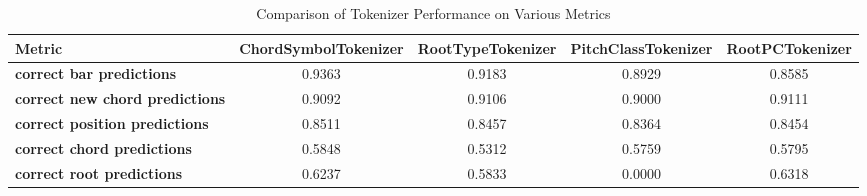 
\begin{table}[h]
    \centering
    \renewcommand{\arraystretch}{1.2}
    \begin{tabular}{lcccc}
        \hline
        \textbf{Metric} & \textbf{ChordSymbolTokenizer} & \textbf{RootTypeTokenizer} & \textbf{PitchClassTokenizer} & \textbf{RootPCTokenizer} \\
        \hline
        \textbf{correct bar predictions} & 0.9363 & 0.9183 & 0.8929 & 0.8585 \\
    \textbf{correct new chord predictions} & 0.9092 & 0.9106 & 0.9000 & 0.9111 \\
    \textbf{correct position predictions} & 0.8511 & 0.8457 & 0.8364 & 0.8454 \\
    \textbf{correct chord predictions} & 0.5848 & 0.5312 & 0.5759 & 0.5795 \\
    \textbf{correct root predictions} & 0.6237 & 0.5833 & 0.0000 & 0.6318 \\
    \hline
    \end{tabular}
    \caption{Comparison of Tokenizer Performance on Various Metrics}
    \label{tab:tokenizer_performance}
\end{table}
